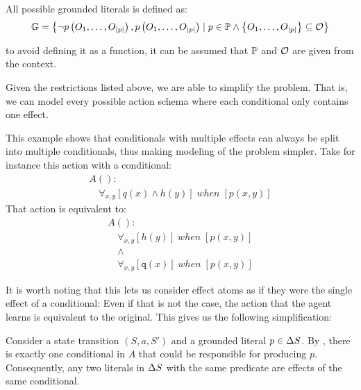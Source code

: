 \documentclass[\master/Master.tex]{subfiles}
\begin{document}
\begin{definition}
	All possible grounded literals \glits is defined as:
	\begin{equation*}
		\mathbb{G} =
		\left\{ \neg p\left(O_1, \dots, O_{|p|}\right), 
				p\left(O_1, \dots, O_{|p|}\right) 
				\mid 
		p \in \mathbb{P} \land 
		\left\{O_1, \dots, O_{|p|} \right\} \subseteq \mathcal{O}
		\right\}
	\end{equation*}
	
	to avoid defining it as a function, it can be assumed that $\mathbb{P}$ and $\mathcal{O}$ are given from the context.
\end{definition}


Given the restrictions listed above, we are able to simplify the problem. That is, we can model every possible action schema where each conditional only contains one effect.

\begin{example} This example shows that conditionals with multiple effects can always be split into multiple conditionals, thus making modeling of the problem simpler.
	Take for instance this action with a conditional:	
	\begin{align*}
		&A():&  \\
		&\quad
		\forall_{x, y}
			\left[
				q(x) \land h(y)
			\right]
		\; when \;
		\left[ p(x,y) \right]
	\end{align*}		
	That action is equivalent to: 
	\begin{align*}
		&A():&  \\
			 &\quad\forall_{x, y}
				\left[
				h(y)
				\right]
				\; when \;
				\left[ p(x,y) \right] \\
		&\quad\land 	\\		
		&\quad\forall_{x, y}
		\left[
		\texttt{q}(x)
		\right]
		\; when \;
		\left[ p(x,y) \right]
	\end{align*}
	
\end{example}

It is worth noting that this lets us consider effect atoms as if they were the single effect of a conditional: Even if that is not the case, the action that the agent learns is equivalent to the original. This gives us the following simplification:

\begin{proposition}\label{prop:ca:singleConditional}
    Consider a state transition $\left(S, a, S'\right)$ and a grounded literal $p \in \Delta S$. By , there is exactly one conditional in $A$ that could be responsible for producing $p$. Consequently, any two literals in $\Delta S$ with the same predicate are effects of the same conditional.
\end{proposition}
\end{document}
